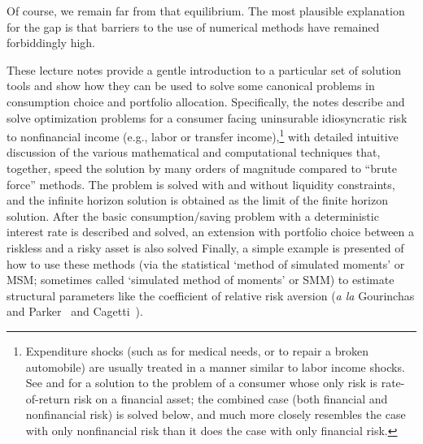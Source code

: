 \documentclass[titlepage]{\econtex}
\begin{document}
Of course, we remain far from that equilibrium.  The most plausible 
explanation for the gap is that barriers to the use of numerical 
methods have remained forbiddingly high.  

   
   
   
   


These lecture notes provide a gentle introduction to a particular set
of solution tools and show how they can be used to solve some
canonical problems in consumption choice and portfolio allocation.
Specifically, the notes describe and solve optimization problems for a
consumer facing uninsurable idiosyncratic risk to nonfinancial income
(e.g., labor or transfer income),\footnote{Expenditure shocks (such as
  for medical needs, or to repair a broken automobile) are usually
  treated in a manner similar to labor income shocks.  See
  \cite{merton:restat} and \cite{samuelson:portfolio} for a solution
  to the problem of a consumer whose only risk is rate-of-return risk
  on a financial asset; the combined case (both financial and
  nonfinancial risk) is solved below, and much more closely resembles
  the case with only nonfinancial risk than it does the case with only
  financial risk.}  with detailed intuitive discussion of the various
mathematical and computational techniques that, together, speed the
solution by many orders of magnitude compared to
``brute force'' methods.  The problem is solved with and without
liquidity constraints, and the infinite horizon solution is
obtained as the limit of the finite horizon solution.  After the basic
consumption/saving problem with a deterministic interest rate is
described and solved, an extension with portfolio choice between a
riskless and a risky asset is also solved  Finally, a simple example
is presented of how to use these methods (via the statistical `method
of simulated moments' or MSM; sometimes called `simulated method of
moments' or SMM) to estimate structural parameters like the
coefficient of relative risk aversion (\textit{a la} Gourinchas and
Parker~\citeyearpar{gpLifecycle} and
Cagetti~\citeyearpar{cagettiWprofiles}).  %

\renewcommand{\DiscAlt}{\beta} %
\hypertarget{The-Problem}{}
\end{document}

